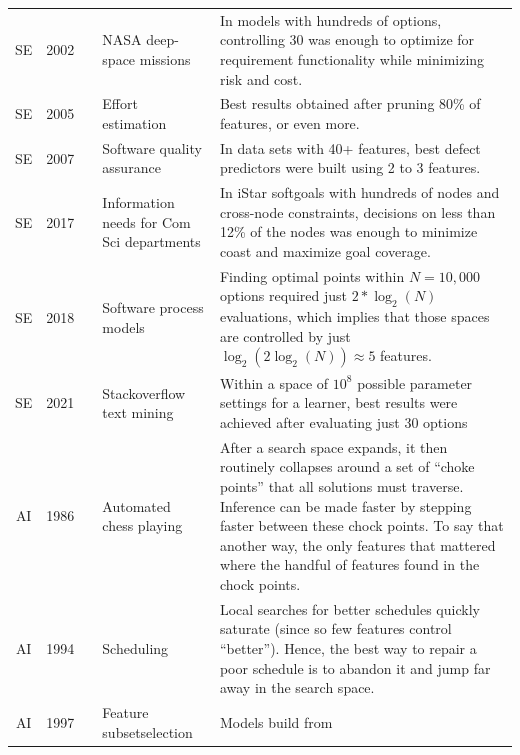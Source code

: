    
 
 \begin{table} 
{\small
\begin{tabular}{|cccP{1in}p{4in}|}\hline
{}SE&2002 & \cite{DBLP:conf/re/FeatherM02} 
& NASA deep-space  missions &
In models with hundreds of options, controlling 30  was enough
to optimize for requirement functionality while minimizing risk and cost.\\
SE&2005 &\cite{DBLP:journals/software/ChenBMP05} &  Effort estimation  &
Best results   obtained after pruning 80\% of  features, or even more.\\
SE &2007 & \cite{DBLP:journals/tse/MenziesGF07} & Software quality \newline assurance
& In data sets with 40+ features, best defect predictors were built using 2 to 3 features.\\
SE&2017 & \cite{DBLP:conf/icse/MathewAM17} & Information needs for 
Com Sci departments & In iStar softgoals with hundreds of nodes and cross-node constraints, decisions on less than 12\%  of the nodes
was enough to minimize coast and maximize goal coverage.\\
SE& 2018  &\cite{chen2018sampling} & Software process models & Finding
optimal points within $N=10,000$ options
required just \mbox{$2*\log_2({N})$} evaluations, which implies that those
spaces are controlled by just $\log_2({2\log_2({N})})\approx 5$ features.\\
SE&2021 & \cite{agrawal2020simpler}& Stackoverflow  text mining& Within a space of $10^8$ possible parameter
settings for a learner, best results were achieved after evaluating just 30
options \\\hline
{}AI & 1986 &  \cite{amarel86} & Automated chess playing & After a search space expands, it then routinely collapses around a set of ``choke points'' that all solutions must traverse. Inference can be made faster by stepping faster between these
chock points. To say that another way,  the only features that mattered
where the  handful
of features found in the chock points.\\
AI & 1994 & \cite{Crawford94} & Scheduling & Local searches for better schedules quickly saturate (since so few features control ``better'').  Hence, the best way to repair a poor schedule is to abandon it  and jump far away in the search space.\\
AI & 1997&\cite{kohavi1997wrappers} & Feature subset\newline  selection & Models build from

\end{tabular}}
\end{table}
